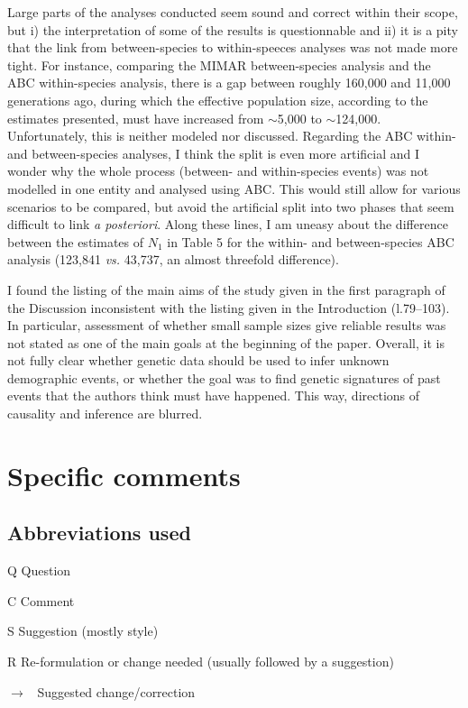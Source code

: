 \documentclass[11pt]{article}
\newenvironment{my_description}
{\begin{description}
  \setlength{\itemsep}{2pt}
  \setlength{\parskip}{0pt}
  \setlength{\parsep}{0pt}}
{\end{description}}
\newenvironment{my_enumerate}
{\begin{enumerate}
  \setlength{\itemsep}{2pt}
  \setlength{\parskip}{0pt}
  \setlength{\parsep}{0pt}}
{\end{enumerate}}
\newcommand{\ra}{$\rightarrow$\ }
\begin{document}
\begin{my_enumerate}
	\item Large parts of the analyses conducted seem sound and correct within their scope, but i) the interpretation of some of the results is questionnable and ii) it is a pity that the link from between-species to within-speeces analyses was not made more tight. For instance, comparing the MIMAR between-species analysis and the ABC within-species analysis, there is a gap between roughly 160,000 and 11,000 generations ago, during which the effective population size, according to the estimates presented, must have increased from $\sim$5,000 to $\sim$124,000. Unfortunately, this is neither modeled nor discussed. Regarding the ABC within- and between-species analyses, I think the split is even more artificial and I wonder why the whole process (between- and within-species events) was not modelled in one entity and analysed using ABC. This would still allow for various scenarios to be compared, but avoid the artificial split into two phases that seem difficult to link \emph{a posteriori}. Along these lines, I am uneasy about the difference between the estimates of $N_1$ in Table 5 for the within- and between-species ABC analysis (123,841 \emph{vs.} 43,737, an almost threefold difference).
	\item I found the listing of the main aims of the study given in the first paragraph of the Discussion inconsistent with the listing given in the Introduction (l.79--103). In particular, assessment of whether small sample sizes give reliable results was not stated as one of the main goals at the beginning of the paper. Overall, it is not fully clear whether genetic data should be used to infer unknown  demographic events, or whether the goal was to find genetic signatures of past events that the authors think must have happened. This way, directions of causality and inference are blurred.
\end{my_enumerate}
	

\section{Specific comments}

\subsection{Abbreviations used}
\begin{my_description}
	\item[Q] Question
	\item[C] Comment
	\item[S] Suggestion (mostly style)
	\item[R] Re-formulation or change needed (usually followed by a suggestion)
	\item[\ra] Suggested change/correction
\end{my_description}
\end{document}
